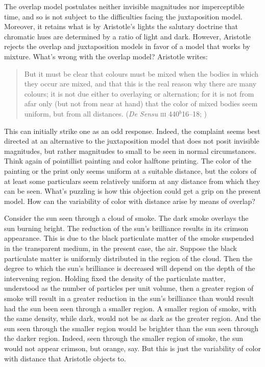 The overlap model postulates neither invisible magnitudes nor imperceptible time, and so is not subject to the difficulties facing the juxtaposition model. Moreover, it retains what is by Aristotle's lights the salutary doctrine that chromatic hues are determined by a ratio of light and dark. However, Aristotle rejects the overlap and juxtaposition models in favor of a model that works by mixture. What's wrong with the overlap model? Aristotle writes:
\begin{quote}
	But it must be clear that colours must be mixed when the bodies in which they occur are mixed, and that this is the real reason why there are many colours; it is not due either to overlaying or alternation; for it is not from afar only (but not from near at hand) that the color of mixed bodies seem uniform, but from all distances. (\emph{De Sensu} \textsc{iii} 440\( ^{b} \)16--18; \citealt[237]{Hett:1936fk})
\end{quote}
This can initially strike one as an odd response. Indeed, the complaint seems best directed at an alternative to the juxtaposition model that does not posit invisible magnitudes, but rather magnitudes to small to be seen in normal circumstances. Think again of pointillist painting and color halftone printing. The color of the painting or the print only seems uniform at a suitable distance, but the colors of at least some particulars seem relatively uniform at any distance from which they can be seen. What's puzzling is how this objection could get a grip on the present model. How can the variability of color with distance arise by means of overlap?

Consider the sun seen through a cloud of smoke. The dark smoke overlays the sun burning bright. The reduction of the sun's brilliance results in its crimson appearance. This is due to the black particulate matter of the smoke suspended in the transparent medium, in the present case, the air. Suppose the black particulate matter is uniformly distributed in the region of the cloud. Then the degree to which the sun's brilliance is decreased will depend on the depth of the intervening region. Holding fixed the density of the particulate matter, understood as the number of particles per unit volume, then a greater region of smoke will result in a greater reduction in the sun's brilliance than would result had the sun been seen through a smaller region. A smaller region of smoke, with the same density, while dark, would not be as dark as the greater region. And the sun seen through the smaller region would be brighter than the sun seen through the darker region. Indeed, seen through the smaller region of smoke, the sun would not appear crimson, but orange, say. But this is just the variability of color with distance that Aristotle objects to.

